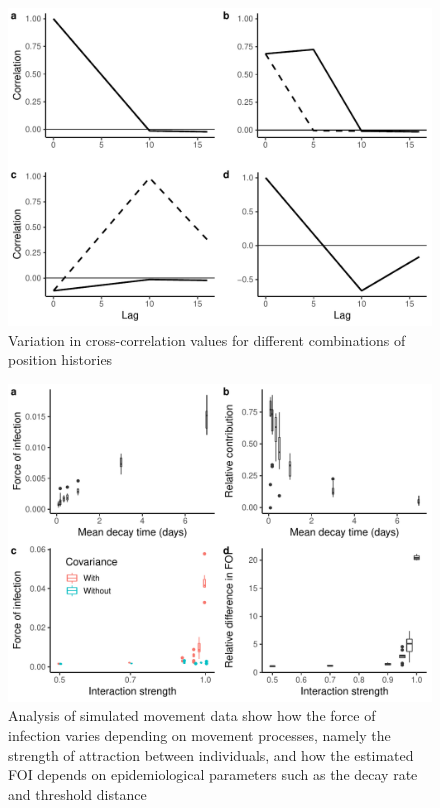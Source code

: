 \documentclass[letterpaper]{article}
\begin{document}
\begin{figure}
    \includegraphics[width=\textwidth]{figures/example_xcorrs.pdf}
    \caption{Variation in cross-correlation values for different combinations of position histories}
	\label{fig:xcorrs}
\end{figure}


\begin{figure}
    \includegraphics[width=\textwidth]{figures/sim_results.pdf}
    \caption{Analysis of simulated movement data show how the force of infection varies depending on movement processes, namely the strength of attraction between individuals, and how the estimated FOI depends on epidemiological parameters such as the decay rate and threshold distance}
	\label{fig:simresults}
\end{figure}
\end{document}
